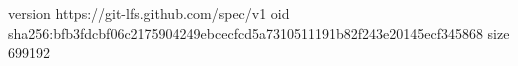 version https://git-lfs.github.com/spec/v1
oid sha256:bfb3fdcbf06c2175904249ebcecfcd5a7310511191b82f243e20145ecf345868
size 699192
